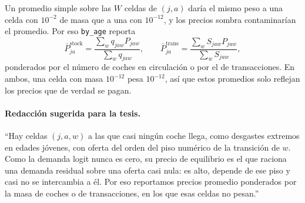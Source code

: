 \documentclass{article}
\begin{document}
Un promedio simple sobre las $W$ celdas de $(j,a)$ daría el mismo peso a una celda con $10^{-2}$ de
masa que a una con $10^{-12}$, y los precios sombra contaminarían el promedio. Por eso
\texttt{by\_age} reporta
$$\bar P^{\text{stock}}_{ja}=\frac{\sum_w q_{jaw}P_{jaw}}{\sum_w q_{jaw}},\qquad
\bar P^{\text{trans}}_{ja}=\frac{\sum_w S_{jaw}P_{jaw}}{\sum_w S_{jaw}},$$
ponderados por el número de coches en circulación o por el de transacciones. En ambos, una celda
con masa $10^{-12}$ pesa $10^{-12}$, así que estos promedios solo reflejan los precios que de verdad
se pagan.

\paragraph{Redacción sugerida para la tesis.} ``Hay celdas $(j,a,w)$ a las que casi ningún coche
llega, como desgastes extremos en edades jóvenes, con oferta del orden del piso numérico de la transición
de $w$. Como la demanda logit nunca es cero, su precio de equilibrio es el que raciona una demanda
residual sobre una oferta casi nula: es alto, depende de ese piso y casi no se intercambia a él.
Por eso reportamos precios promedio ponderados por la masa de coches o de transacciones, en los que
esas celdas no pesan.''
\end{document}
